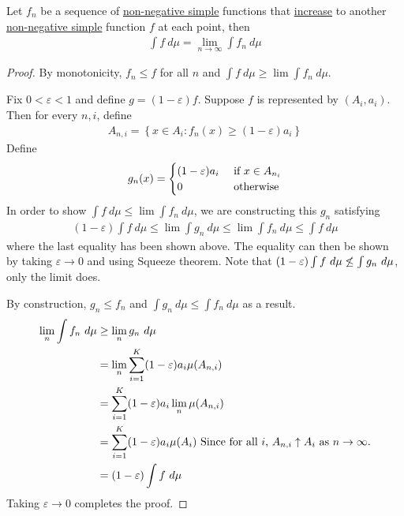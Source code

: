 \documentclass[11pt]{article}
\begin{document}
	\begin{proposition}
		Let $f_n$ be a sequence of \ul{non-negative simple} functions that \ul{increase} to another \ul{non-negative simple} function $f$ at each point, then 
		\begin{align}
			\int f\ d\mu = \lim_{n\to\infty} \int f_n\ d\mu	
		\end{align}
		\begin{proof}
			By monotonicity, $f_n \leq f$ for all $n$ and $\int f\ d\mu \geq \lim \int f_n\ d\mu$.
			
			Fix $0 < \varepsilon < 1$ and define $g = (1-\varepsilon) f$. Suppose $f$ is represented by $(A_i, a_i)$. Then for every $n, i$, define
			\begin{align}
				A_{n, i}=\left\{x \in A_{i}: f_{n}(x) \geq (1-\varepsilon) a_{i}\right\}
			\end{align}
			Define
			\begin{align}
				g_n(x) = \begin{cases}
 					(1-\varepsilon) a_i &\text{{ if }} x \in A_{n_i} \\
 					0 &\text{{ otherwise}}	
				\end{cases}
			\end{align}
			In order to show $\int f\ d\mu \leq \lim \int f_n\ d\mu$, we are constructing this $g_n$ satisfying 
			\begin{align}
				(1-\varepsilon) \int f\ d\mu \leq \lim \int g_n\ d\mu \leq \lim \int f_n\ d\mu \leq \int f\ d\mu
			\end{align}
			where the last equality has been shown above. The equality can then be shown by taking $\varepsilon \to 0$ and using Squeeze theorem. Note that $(1-\varepsilon) \int f\ d\mu \centernot \leq \int g_n\ d\mu$, only the limit does.
			
			By construction, $g_n \leq f_n$ and $\int g_n\ d\mu \leq \int f_n\ d\mu$ as a result.
			\begin{align}
				\lim_n \int f_n\ d\mu &\geq \lim_n g_n\ d\mu \\
				&= \lim_n \sum_{i=1}^K (1-\varepsilon) a_i \mu(A_{n,i}) \\
				&= \sum_{i=1}^K (1-\varepsilon) a_i \lim_n \mu(A_{n,i}) \\
				&= \sum_{i=1}^K (1-\varepsilon) a_i \mu(A_i) \text{{ Since for all $i$, $A_{n,i} \uparrow A_i$ as $n \to \infty$.}}\\
				&= (1-\varepsilon) \int f\ d\mu
			\end{align}
			Taking $\varepsilon \to 0$ completes the proof.
		\end{proof}
	\end{proposition}
	
\end{document}
